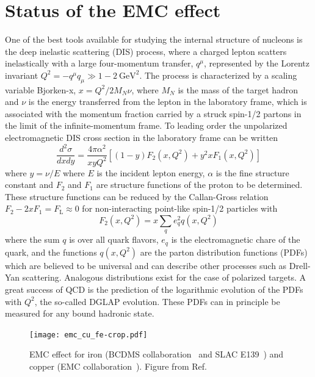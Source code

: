 \section{Status of the EMC effect}

One of the best tools available for studying the internal structure of nucleons is the deep inelastic
scattering (DIS) process, where a charged lepton scatters inelastically with a large four-momentum
transfer, $q^\mu$, represented by the Lorentz invariant $Q^2 = -q^\mu q_\mu \gg 1-2~\mathrm{GeV}^2$.
The process is characterized by a scaling variable Bjorken-x, $x = Q^2/2M_N \nu$, 
where $M_N$ is the mass of the target hadron and $\nu$ is the energy transferred from the lepton in the laboratory frame,
which is associated with the momentum fraction carried by a struck spin-1/2 partons in the limit of the infinite-momentum frame.
To leading order the unpolarized electromagnetic DIS cross section in the laboratory frame can be written~\cite{PhysRevD.98.030001}
\begin{equation}
    \frac{d^2 \sigma}{dx dy} = \frac{4 \pi \alpha^2}{x y Q^2} \left[ (1-y)F_2(x, Q^2) + y^2 x F_1(x, Q^2) \right]
\end{equation}
where $y = \nu/E$ where $E$ is the incident lepton energy, $\alpha$ is the fine structure constant and $F_2$
and $F_1$ are structure functions of the proton to be determined.  These structure functions can be reduced
by the Callan-Gross relation $F_2 - 2xF_1 = F_\mathrm{L} \approx 0$ for non-interacting point-like spin-1/2
particles with
\begin{equation}
    F_2(x,Q^2) = x \sum_{q} e_q^2 q(x,Q^2)
\end{equation}
where the sum $q$ is over all quark flavors,  $e_q$ is the electromagnetic chare of the quark, and the
functions $q(x,Q^2)$ are the parton distribution functions (PDFs) which are believed to be universal
and can describe other processes such as Drell-Yan scattering.  Analogous distributions exist for the case of polarized
targets.  A great success of QCD is the prediction of the logarithmic 
evolution of the PDFs with $Q^2$, the so-called DGLAP evolution.  These PDFs can in principle be measured for any bound hadronic state.

\begin{figure}[tbp]
  \centering\texttt{[image: emc\_cu\_fe-crop.pdf]}
  \caption{EMC effect for iron (BCDMS collaboration~\cite{Benvenuti:1987az} and SLAC E139~\cite{Gomez:1993ri})
    and copper (EMC collaboration~\cite{Ashman:1992kv}).
    Figure from Ref.~\cite{Guzey:2012yk}}
  \label{fig:emc_iron}
\end{figure}

